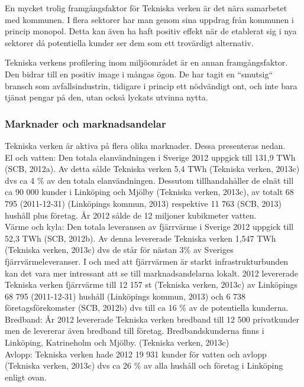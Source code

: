 \documentclass[10pt,a4paper]{article}
\begin{document}
En mycket trolig framgångsfaktor för Tekniska verken är det nära samarbetet med
kommunen. I flera sektorer har man genom sina uppdrag från kommunen i princip
monopol. Detta kan även ha haft positiv effekt när de etablerat sig i nya
sektorer då potentiella kunder ser dem som ett trovärdigt alternativ. 

Tekniska verkens profilering inom miljöområdet är en annan framgångsfaktor. Den
bidrar till en positiv image i mångas ögon. De har tagit en ``smutsig`` bransch
som avfallsindustrin, tidigare i princip ett nödvändigt ont, och inte bara tjänat 
pengar på den, utan också lyckats utvinna nytta.

\subsubsection{Marknader och marknadsandelar}
Tekniska verken är aktiva på flera olika marknader. Dessa presenteras nedan.\\

El och vatten: Den totala elanvändningen i Sverige 2012 uppgick till 131,9 TWh (SCB, 2012a). Av detta sålde Tekniska verken 5,4 TWh (Tekniska verken, 2013c) dvs ca 4 \% av den totala elanvändningen. Dessutom tillhandahåller de elnät  till ca 90 000 kunder i Linköping och Mjölby (Tekniska verken, 2013c), av totalt 68 795 (2011-12-31) (Linköpings kommun, 2013) respektive 11 763 (SCB, 2013) hushåll plus företag. År 2012 sålde de 12 miljoner kubikmeter vatten. \\

Värme och kyla: Den totala leveransen av fjärrvärme i Sverige 2012 uppgick till 52,3 TWh (SCB, 2012b). Av denna levererade Tekniska verken 1,547 TWh (Tekniska verken, 2013c) dvs de står för nästan 3\% av Sveriges fjärrvärmeleveranser. I och med att fjärrvärmen är starkt infrastrukturbunden kan det vara mer intressant att se till marknadsandelarna lokalt. 2012 levererade Tekniska verken fjärrvärme till 12 157 st (Tekniska verken, 2013c) av Linköpings 68 795 (2011-12-31) hushåll (Linköpings kommun, 2013) och 6 738 företagsförekomster (SCB, 2012b) dvs till ca 16 \% av de potentiella kunderna.\\

Bredband: År 2012 levererade Tekniska verken bredband till 12 500 privatkunder men de levererar även bredband till företag. Bredbandskunderna finns i  Linköping, Katrineholm och Mjölby. (Tekniska verken, 2013c)\\

Avlopp: Tekniska verken hade 2012 19 931 kunder för vatten och avlopp (Tekniska verken, 2013c) dvs ca 26 \% av alla hushåll och företag i Linköping enligt ovan. \\
\end{document}
